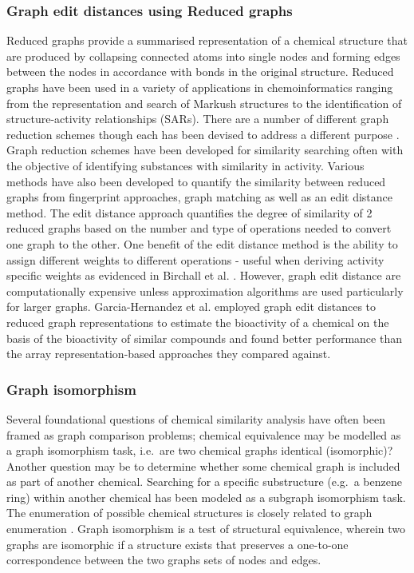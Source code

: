 \documentclass[
  super,
  preprint,
  3p]{elsarticle}
\begin{document}
\subsubsection{Graph edit distances using Reduced
graphs}\label{graph-edit-distances-using-reduced-graphs}

Reduced graphs provide a summarised representation of a chemical
structure that are produced by collapsing connected atoms into single
nodes and forming edges between the nodes in accordance with bonds in
the original structure. Reduced graphs have been used in a variety of
applications in chemoinformatics ranging from the representation and
search of Markush structures to the identification of structure-activity
relationships (SARs). There are a number of different graph reduction
schemes though each has been devised to address a different purpose
\citep{gillet_similarity_2003, birchall_reduced_2011, birchall_training_2006}.
Graph reduction schemes have been developed for similarity searching
often with the objective of identifying substances with similarity in
activity. Various methods have also been developed to quantify the
similarity between reduced graphs from fingerprint approaches, graph
matching as well as an edit distance method. The edit distance approach
quantifies the degree of similarity of 2 reduced graphs based on the
number and type of operations needed to convert one graph to the other.
One benefit of the edit distance method is the ability to assign
different weights to different operations - useful when deriving
activity specific weights as evidenced in Birchall et al.
\citep{birchall_training_2006}. However, graph edit distance are
computationally expensive unless approximation algorithms are used
particularly for larger graphs. Garcia-Hernandez et al. \citep{RN25}
employed graph edit distances to reduced graph representations to
estimate the bioactivity of a chemical on the basis of the bioactivity
of similar compounds and found better performance than the array
representation-based approaches they compared against.

\subsubsection{Graph isomorphism}\label{graph-isomorphism}

Several foundational questions of chemical similarity analysis have
often been framed as graph comparison problems; chemical equivalence may
be modelled as a graph isomorphism task, i.e.~are two chemical graphs
identical (isomorphic)? Another question may be to determine whether
some chemical graph is included as part of another chemical. Searching
for a specific substructure (e.g.~a benzene ring) within another
chemical has been modeled as a subgraph isomorphism task. The
enumeration of possible chemical structures is closely related to graph
enumeration \citep{RN22}. Graph isomorphism is a test of structural
equivalence, wherein two graphs are isomorphic if a structure exists
that preserves a one-to-one correspondence between the two graphs sets
of nodes and edges.
\end{document}
